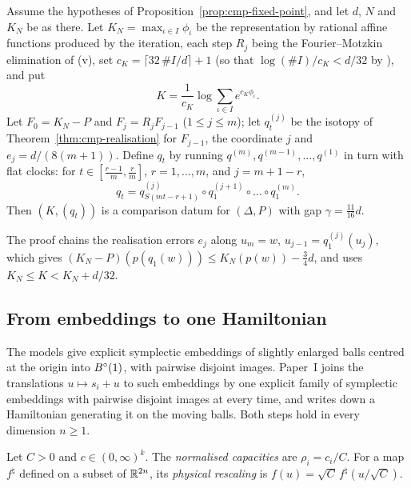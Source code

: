 \begin{theorem}\label{thm:cmp-main}
Assume the hypotheses of Proposition~\ref{prop:cmp-fixed-point}, and let $d$, $N$ and $K_N$ be as there. Let
$K_N=\max_{\iota\in I}\phi_\iota$ be the representation by rational affine functions produced by the iteration, each
step $R_j$ being the Fourier--Motzkin elimination of (v), set
$c_K=\lceil32\,\#I/d\rceil+1$ (so that $\log(\#I)/c_K<d/32$ by ), and put
\[
 K=\frac1{c_K}\log\sum_{\iota\in I}e^{c_K\phi_\iota}.
\]
Let $F_0=K_N-P$ and $F_j=R_jF_{j-1}$ ($1\le j\le m$); let $q^{(j)}_t$ be the isotopy of
Theorem~\ref{thm:cmp-realisation} for $F_{j-1}$, the coordinate $j$ and $e_j=d/(8(m+1))$. Define $q_t$ by running
$q^{(m)},q^{(m-1)},\dots,q^{(1)}$ in turn with flat clocks: for $t\in[\frac{r-1}m,\frac rm]$, $r=1,\dots,m$, and
$j=m+1-r$,
\[
 q_t=q^{(j)}_{S(mt-r+1)}\circ q^{(j+1)}_1\circ\dots\circ q^{(m)}_1 .
\]
Then $(K,(q_t))$ is a comparison datum for $(\Delta,P)$ with gap $\gamma=\tfrac{11}{16}d$.
\end{theorem}

The proof chains the realisation errors $e_j$ along $u_m=w$, $u_{j-1}=q^{(j)}_1(u_j)$, which gives
$(K_N-P)(p(q_1(w)))\le K_N(p(w))-\frac34d$, and uses $K_N\le K<K_N+d/32$.

\subsection{From embeddings to one Hamiltonian}\label{p2:sec-machine-ham}

The models give explicit symplectic embeddings of slightly enlarged balls centred at the origin into $B^{\circ}(1)$, with
pairwise disjoint images. Paper~I joins the translations $u\mapsto s_i+u$ to such embeddings by one explicit family of
symplectic embeddings with pairwise disjoint images at every time, and writes down a Hamiltonian generating it on the
moving balls. Both steps hold in every dimension $n\ge1$.

\begin{definition}\label{I:def:ham-normalise}
Let $C>0$ and $c\in(0,\infty)^k$. The \emph{normalised capacities} are $\rho_i=c_i/C$. For a map $f^\natural$
defined on a subset of $\mathbb{R}^{2n}$, its \emph{physical rescaling} is $f(u)=\sqrt C\,f^\natural(u/\sqrt C)$.
\end{definition}

